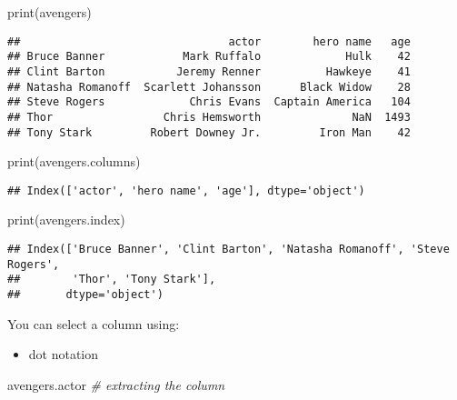\documentclass[
]{book}
\newenvironment{Shaded}{\begin{snugshade}}{\end{snugshade}}
\newcommand{\BuiltInTok}[1]{#1}
\newcommand{\CommentTok}[1]{\textcolor[rgb]{0.56,0.35,0.01}{\textit{#1}}}
\newcommand{\NormalTok}[1]{#1}
\providecommand{\tightlist}{%
  \setlength{\itemsep}{0pt}\setlength{\parskip}{0pt}}
\begin{document}
\begin{Shaded}
\begin{Highlighting}[]
\BuiltInTok{print}\NormalTok{(avengers)}
\end{Highlighting}
\end{Shaded}

\begin{verbatim}
##                                actor        hero name   age
## Bruce Banner            Mark Ruffalo             Hulk    42
## Clint Barton           Jeremy Renner          Hawkeye    41
## Natasha Romanoff  Scarlett Johansson      Black Widow    28
## Steve Rogers             Chris Evans  Captain America   104
## Thor                 Chris Hemsworth              NaN  1493
## Tony Stark         Robert Downey Jr.         Iron Man    42
\end{verbatim}

\begin{Shaded}
\begin{Highlighting}[]
\BuiltInTok{print}\NormalTok{(avengers.columns)}
\end{Highlighting}
\end{Shaded}

\begin{verbatim}
## Index(['actor', 'hero name', 'age'], dtype='object')
\end{verbatim}

\begin{Shaded}
\begin{Highlighting}[]
\BuiltInTok{print}\NormalTok{(avengers.index)}
\end{Highlighting}
\end{Shaded}

\begin{verbatim}
## Index(['Bruce Banner', 'Clint Barton', 'Natasha Romanoff', 'Steve Rogers',
##        'Thor', 'Tony Stark'],
##       dtype='object')
\end{verbatim}

You can select a column using:

\begin{itemize}
\tightlist
\item
  dot notation
\end{itemize}

\begin{Shaded}
\begin{Highlighting}[]
\NormalTok{avengers.actor }\CommentTok{\# extracting the column}
\end{Highlighting}
\end{Shaded}
\end{document}
